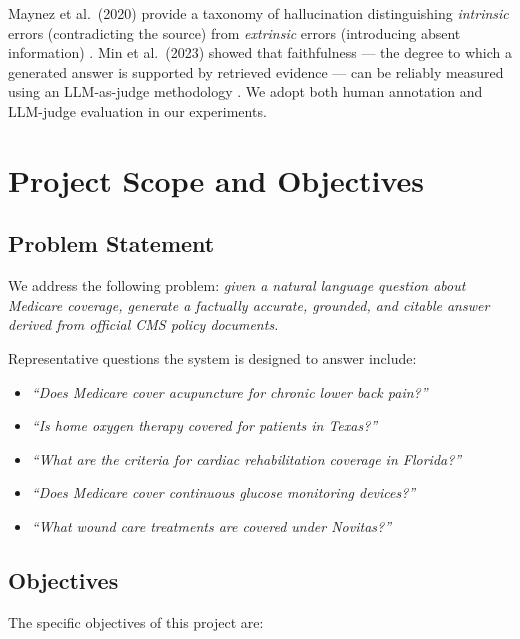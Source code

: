 \documentclass[12pt, letterpaper]{article}
\begin{document}
Maynez et al.\ (2020) provide a taxonomy of hallucination distinguishing \textit{intrinsic}
errors (contradicting the source) from \textit{extrinsic} errors (introducing absent
information) \cite{maynez2020hallucination}. Min et al.\ (2023) showed that faithfulness
--- the degree to which a generated answer is supported by retrieved evidence --- can be
reliably measured using an LLM-as-judge methodology \cite{min2023faitheval}. We adopt
both human annotation and LLM-judge evaluation in our experiments.

\section{Project Scope and Objectives}

\subsection{Problem Statement}

We address the following problem: \textit{given a natural language question about Medicare
coverage, generate a factually accurate, grounded, and citable answer derived from official
CMS policy documents.}

Representative questions the system is designed to answer include:

\begin{itemize}[noitemsep, topsep=4pt]
    \item \textit{``Does Medicare cover acupuncture for chronic lower back pain?''}
    \item \textit{``Is home oxygen therapy covered for patients in Texas?''}
    \item \textit{``What are the criteria for cardiac rehabilitation coverage in Florida?''}
    \item \textit{``Does Medicare cover continuous glucose monitoring devices?''}
    \item \textit{``What wound care treatments are covered under Novitas?''}
\end{itemize}

\subsection{Objectives}

The specific objectives of this project are:
\end{document}
